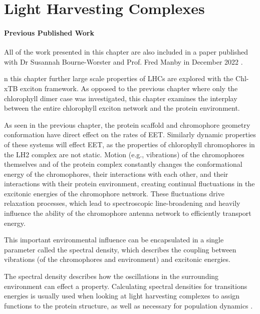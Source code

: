 %
%
\let\textcircled=\pgftextcircled
\chapter{Light Harvesting Complexes}
\label{chap:LH2}

\subsubsection*{Previous Published Work}
All of the work presented in this chapter are also included in a paper published 
with Dr Susannah Bourne-Worster and Prof. Fred Manby in December 2022 \cite{Feighan2023}.

n this chapter further large scale properties of LHCs are explored with
the Chl-xTB exciton framework. As opposed to the previous chapter where only the 
chlorophyll dimer case was investigated, this chapter examines the interplay between
the entire chlorophyll exciton network and the protein environment.

As seen in the previous chapter, the protein scaffold and chromophore geometry conformation
have direct effect on the rates of EET. Similarly dynamic properties of these systems
will effect EET, as the properties of chlorophyll chromophores in the LH2 complex
are not static. Motion (e.g., vibrations) of the chromophores themselves and of 
the protein complex constantly changes the conformational energy of the chromophores,
their interactions with each other, and their interactions with their protein environment, 
creating continual fluctuations in the excitonic energies of the chromophore network. 
These fluctuations drive relaxation processes, which lead to spectroscopic line-broadening 
and heavily influence the ability of the chromophore antenna network to efficiently 
transport energy.

This important environmental influence can be encapsulated in a single parameter 
called the spectral density, which describes the coupling between vibrations (of 
the chromophores and environment) and excitonic energies.

The spectral density describes how the oscillations in the surrounding environment 
can effect a property. Calculating spectral densities for transitions energies is
usually used when looking at light harvesting complexes to assign functions to the 
protein structure, as well as necessary for population dynamics \cite{Mallus2018}.

